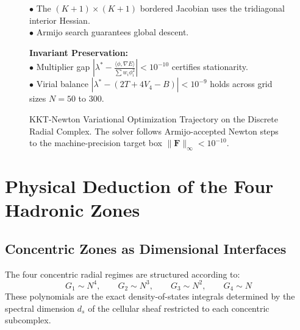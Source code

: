 \documentclass[
    12pt,
    a4paper,
    headings=normal,
    twoside=false,
    open=any,
    parskip=half
]{scrbook}
\begin{document}
\begin{figure}[htbp]
\begin{tcolorbox}[colback=white, colframe=secondarycolor!70, arc=2mm, boxrule=0.7pt, left=6pt, right=6pt, top=4pt, bottom=4pt, width=\linewidth]
\begin{minipage}[t]{0.48\textwidth}
  $\bullet$ The $(K+1)\times(K+1)$ bordered Jacobian uses the tridiagonal interior Hessian.\\[1pt]
  $\bullet$ Armijo search guarantees global descent.
\end{minipage}\hfill
\begin{minipage}[t]{0.48\textwidth}
  \textbf{\color{accentcolor}Invariant Preservation:}\\[1pt]
  $\bullet$ Multiplier gap $\left|\lambda^* - \frac{\langle\phi, \nabla E\rangle}{\sum w_i \phi_i^2}\right| < 10^{-10}$ certifies stationarity.\\[1pt]
  $\bullet$ Virial balance $|\lambda^* - (2T + 4V_4 - B)| < 10^{-9}$ holds across grid sizes $N=50$ to $300$.
\end{minipage}
\end{tcolorbox}
\vspace{-2mm}
\caption{KKT-Newton Variational Optimization Trajectory on the Discrete Radial Complex. The solver follows Armijo-accepted Newton steps to the machine-precision target box $\|\mathbf{F}\|_\infty < 10^{-10}$.}
\label{fig:ch3_kkt_optimization_phase_space}
\end{figure}

\section{Physical Deduction of the Four Hadronic Zones}
\label{sec:ch3_matched_asymptotics_faulhaber}

\subsection{Concentric Zones as Dimensional Interfaces}

The four concentric radial regimes are structured according to:
\begin{equation*}
G_1 \sim N^4, \qquad G_2 \sim N^3, \qquad G_3 \sim N^2, \qquad G_4 \sim N
\end{equation*}
These polynomials are the exact density-of-states integrals determined by the spectral dimension $d_s$ of the cellular sheaf restricted to each concentric subcomplex.
\end{document}
